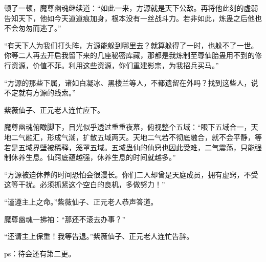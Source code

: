 \begin{this_body}
顿了一顿，魔尊幽魂继续道：“如此一来，方源就是天下公敌。再将他此刻的虚弱告知天下，他如今天道道痕加身，根本没有一丝战斗力。若非如此，炼蛊之后他也不会匆匆而逃了。”

“有天下人为我们打头阵，方源能躲到哪里去？就算躲得了一时，也躲不了一世。你等二人再去开启我留下来的几座秘密库藏，那都是我炼制至尊仙胎蛊用不到的修行资源，价值不菲。利用这些资源，你们重建影宗，为我招兵买马。”

“方源的那些下属，诸如白凝冰、黑楼兰等人，不都遗留在外吗？找到这些人，说不定就有方源的线索。”

紫薇仙子、正元老人连忙应下。

魔尊幽魂俯瞰脚下，目光似乎透过重重夜幕，俯视整个五域：“眼下五域合一，天地二气融汇，形成气潮，扩散五域两天。天地二气若不彻底融合，就不会平静，等若是五域界壁被稀释，笼罩五域。五域蛊仙的仙窍也因此受难，二气震荡，只能强制休养生息。仙窍底蕴越强，休养生息的时间就越多。”

“方源被迫休养的时间恐怕会很漫长。你们二人却曾是天庭成员，拥有虚窍，不受这等干扰。必须抓紧这个空白的良机，多做努力！”

“谨遵主上之命。”紫薇仙子、正元老人恭声答道。

魔尊幽魂一拂袖：“那还不滚去办事？”

“还请主上保重！我等告退。”紫薇仙子、正元老人连忙告辞。

ps：待会还有第二更。

\end{this_body}

